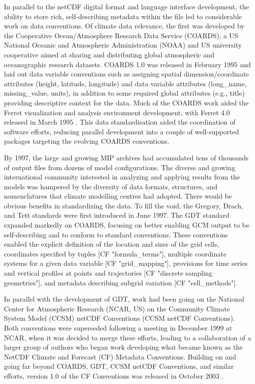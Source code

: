\documentclass[manuscript]{copernicus}
\newcommand{\mycomment}[1]{}
\begin{document}
In parallel to the netCDF digital format and language interface development, the ability to store rich, self-describing metadata within the file led to considerable work on data conventions. Of climate data relevance, the first was developed by the Cooperative Ocean/Atmosphere Research Data Service (COARDS), a US National Oceanic and Atmospheric Administration (NOAA) and US university cooperative aimed at sharing and distributing global atmospheric and oceanographic research datasets. COARDS 1.0 was released in February 1995 and laid out data variable conventions such as assigning spatial dimension/coordinate attributes (height, latitude, longitude) and data variable attributes (long\_name, missing\_value, units), in addition to some required global attributes (e.g., title) providing descriptive context for the data. Much of the COARDS work aided the Ferret visualization and analysis environment development, with Ferret 4.0 released in March 1995 \citep{noaa_pmel_version_1995}. This data standardisation aided the coordination of software efforts, reducing parallel development into a couple of well-supported packages targeting the evolving COARDS conventions.
\mycomment{
https://ferret.pmel.noaa.gov/Ferret/documentation/coards-netcdf-conventions
Also NCAR CSM - see http://cfconventions.org/conventions.html
}

By 1997, the large and growing MIP archives had accumulated tens of thousands of output files from dozens of model configurations. The diverse and growing international community interested in analyzing and applying results from the models was hampered by the diversity of data formats, structures, and nomenclatures that climate modelling centres had adopted. There would be obvious benefits in standardizing the data. To fill the void, the Gregory, Drach, and Tett \citep[GDT v1.4;][]{gregory_gdt_1999} standards were first introduced in June 1997. The GDT standard expanded markedly on COARDS, focusing on better enabling GCM output to be self-describing and to conform to standard conventions. These conventions enabled the explicit definition of the location and sizes of the grid cells, coordinates specified by tuples [CF "formula\_terms"], multiple coordinate systems for a given data variable [CF "grid\_mapping"], provisions for time series and vertical profiles at points and trajectories [CF "discrete sampling geometries"], and metadata describing subgrid variation [CF "cell\_methods"].

In parallel with the development of GDT, work had been going on the National Center for Atmospheric Research (NCAR, US) on the Community Climate System Model (CCSM) netCDF Conventions (CCSM netCDF Conventions). Both conventions were superseded following a meeting in December 1999 at NCAR, when it was decided to merge these efforts, leading to a collaboration of a larger group of authors who began work developing what became known as the NetCDF Climate and Forecast (CF) Metadata Conventions. Building on and going far beyond COARDS, GDT, CCSM netCDF Conventions, and similar efforts, version 1.0 of the CF Conventions was released in October 2003 \citep[e.g.,][]{eaton_netcdf_2024}.
\end{document}

